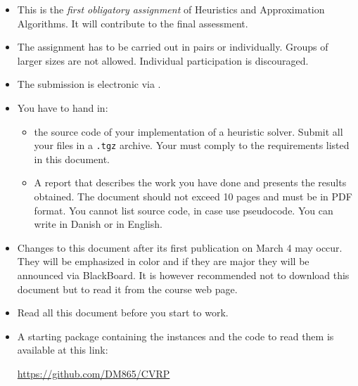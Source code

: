 
\begin{itemize}

\item This is the \emph{first obligatory assignment} of Heuristics and
  Approximation Algorithms. It will contribute to the final assessment.

\item The assignment has to be carried out in pairs or
  individually. Groups of larger sizes are not allowed. Individual
  participation is discouraged.

\item The submission is electronic via
  .

\item  You have to hand in:
  \begin{itemize}
  \item the source code of your implementation of a heuristic
    solver. Submit all your files in a \lstinline{.tgz} archive. Your
    must comply to the requirements listed in this document.
    
  \item A report that describes the work you have done and presents the
    results obtained. The document should not exceed 10 pages and must
    be in PDF format. You cannot list source code, in case use
    pseudocode. You can write in Danish or in English.
  \end{itemize} 

%

\item Changes to this document after its first publication on March 4
  may occur. They will be emphasized in color and if they are major they
  will be announced via BlackBoard. It is however recommended not to
  download this document but to read it from the course web page.

\item Read all this document before you start to work.

\item A starting package containing the instances and the code to read
  them is available at this link:
\begin{center}
\url{https://github.com/DM865/CVRP}
\end{center}
\end{itemize}




